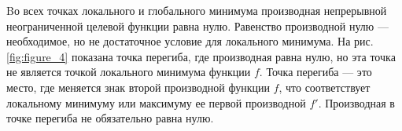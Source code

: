Bо всех точках локального и глобального минимума производная непрерывной неограниченной целевой функции равна нулю. Равенство производной нулю — необходимое, но не достаточное условие для локального минимума.\cite{kochenderfer2020optimization}
На рис. \ref{fig:figure_4} показана точка перегиба, где производная равна нулю, но эта точка не является точкой локального минимума функции $f$. Точка перегиба — это место, где меняется знак второй производной функции $f$, что соответствует локальному минимуму или максимуму ее первой производной $f '$. Производная в точке перегиба не обязательно равна нулю.
